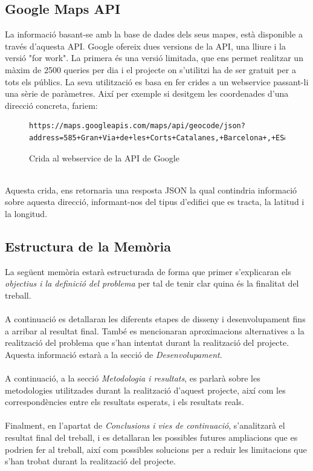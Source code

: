 \documentclass[12pt,a4paper,openright,oneside]{article}
\numberwithin{equation}{section}
\theoremstyle{definition}
\begin{document}
\subsection*{Google Maps API}
La informació basant-se amb la base de dades dels seus mapes, està disponible a través d'aquesta API. Google ofereix dues versions de la API, una lliure i la versió "for work". La primera és una versió limitada, que ens permet realitzar un màxim de 2500 queries per dia i el projecte on s'utilitzi ha de ser gratuit per a tots els públics.
La seva utilització es basa en fer crides a un webservice passant-li una sèrie de paràmetres. Així per exemple si desitgem les coordenades d'una direcció concreta, fariem:\\
\begin{figure}[htbp]
\begin{verbatim}
https://maps.googleapis.com/maps/api/geocode/json?
address=585+Gran+Via+de+les+Corts+Catalanes,+Barcelona+,+ES&key=API_KEY
\end{verbatim}
\caption{Crida al webservice de la API de Google}
\end{figure}
\\
Aquesta crida, ens retornaria una resposta JSON la qual contindria informació sobre aquesta direcció, informant-nos del tipus d'edifici que es tracta, la latitud i la longitud.\\

\subsection{Estructura de la Memòria}
La següent memòria estarà estructurada de forma que primer s'explicaran els \textit{objectius i la definició del problema} per tal de tenir clar quina és la finalitat del treball. \\\\
A continuació es detallaran les diferents etapes de disseny i desenvolupament fins a arribar al resultat final. També es mencionaran aproximacions alternatives a la realització del problema que s'han intentat durant la realització del projecte. Aquesta informació estarà a la secció de \textit{Desenvolupament}.\\\\
A continuació, a la secció \textit{Metodologia i resultats}, es parlarà sobre les metodologies utilitzades durant la realització d'aquest projecte, així com les correspondències entre els resultats esperats, i els resultats reals.\\\\
Finalment, en l'apartat de \textit{Conclusions i vies de continuació}, s'analitzarà el resultat final del treball, i es detallaran les possibles futures ampliacions que es podrien fer al treball, així com possibles solucions per a reduir les limitacions que s'han trobat durant la realització del projecte.
\end{document}
